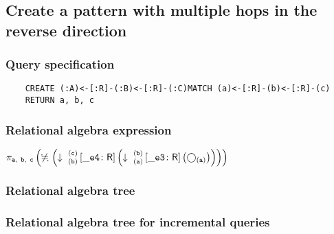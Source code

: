 	\subsection{Create a pattern with multiple hops in the reverse direction}

	\subsubsection*{Query specification}

	\begin{lstlisting}
	CREATE (:A)<-[:R]-(:B)<-[:R]-(:C)MATCH (a)<-[:R]-(b)<-[:R]-(c)
	RETURN a, b, c
	\end{lstlisting}


	\subsubsection*{Relational algebra expression}

	$\projection{\var{a},~\var{b},~\var{c}} \left(\alldifferent{} \left(\expandin{b}{c}{}{\_e4}{R} \left(\expandin{a}{b}{}{\_e3}{R} \left(\getvertices{a}{}\right)\right)\right)\right)$

	\subsubsection*{Relational algebra tree}


	\subsubsection*{Relational algebra tree for incremental queries}

